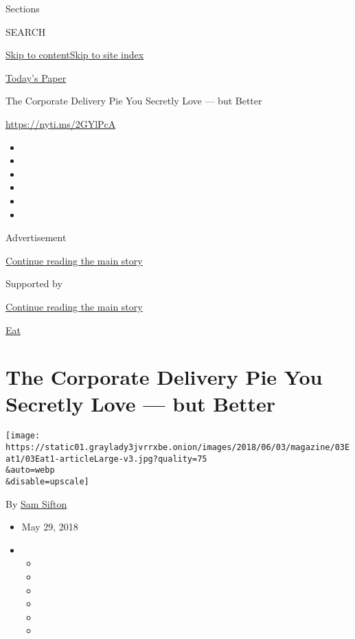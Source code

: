 Sections

SEARCH

\protect\hyperlink{site-content}{Skip to
content}\protect\hyperlink{site-index}{Skip to site index}

\href{https://myaccount.nytimes3xbfgragh.onion/auth/login?response_type=cookie\&client_id=vi}{}

\href{https://www.nytimes3xbfgragh.onion/section/todayspaper}{Today's
Paper}

The Corporate Delivery Pie You Secretly Love --- but Better

\url{https://nyti.ms/2GYlPcA}

\begin{itemize}
\item
\item
\item
\item
\item
\item
\end{itemize}

Advertisement

\protect\hyperlink{after-top}{Continue reading the main story}

Supported by

\protect\hyperlink{after-sponsor}{Continue reading the main story}

\href{/column/magazine-eat}{Eat}

\hypertarget{the-corporate-delivery-pie-you-secretly-love--but-better}{%
\section{The Corporate Delivery Pie You Secretly Love --- but
Better}\label{the-corporate-delivery-pie-you-secretly-love--but-better}}

\texttt{[image: https://static01.graylady3jvrrxbe.onion/images/2018/06/03/magazine/03Eat1/03Eat1-articleLarge-v3.jpg?quality=75\\\&auto=webp\\\&disable=upscale]}

By \href{http://www.nytimes3xbfgragh.onion/by/sam-sifton}{Sam Sifton}

\begin{itemize}
\item
  May 29, 2018
\item
  \begin{itemize}
  \item
  \item
  \item
  \item
  \item
  \item
  \end{itemize}
\end{itemize}

